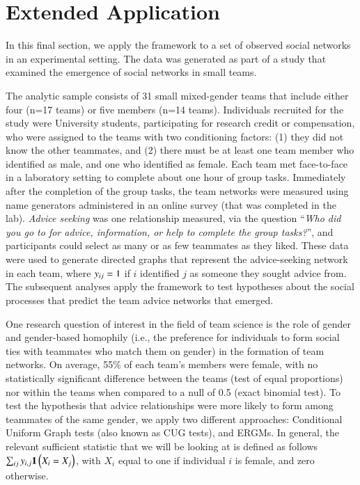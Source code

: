 \documentclass[review, nonatbib,doubleblind]{elsarticle/elsarticle}
\begin{document}
\section{Extended Application\label{sec:empirical}}

In this final section, we apply the \ergmitos{} framework to a set of observed social networks in an experimental setting. The data was generated as part of a study that examined the emergence of social networks in small teams. 

The analytic sample consists of 31 small mixed-gender teams that include either four (n=17 teams) or five members (n=14 teams). Individuals recruited for the study were University students, participating for research credit or compensation, who were assigned to the teams with two conditioning factors: (1) they did not know the other teammates, and (2) there must be at least one team member who identified as male, and one who identified as female. Each team met face-to-face in a laboratory setting to complete about one hour of group tasks. Immediately after the completion of the group tasks, the team networks were measured using name generators administered in an online survey (that was completed in the lab). \textit{Advice seeking} was one relationship measured, via the question ``\textit{Who did you go to for advice, information, or help to complete the group tasks?}'', and participants could select as many or as few teammates as they liked. These data were used to generate directed graphs that represent the advice-seeking network in each team, where $y_{ij} = 1$ if $i$ identified $j$ as someone they sought advice from. The subsequent analyses apply the \ergmitos{} framework to test hypotheses about the social processes that predict the team advice networks that emerged. 

One research question of interest in the field of team science is the role of gender and gender-based homophily (i.e., the preference for individuals to form social ties with teammates who match them on gender) in the formation of team networks. On average, 55\% of each team's members were female, with no statistically significant difference between the teams (test of equal proportions) nor within the teams when compared to a null of 0.5 (exact binomial test). To test the hypothesis that advice relationships were more likely to form among teammates of the same gender, we apply two different approaches: Conditional Uniform Graph tests (also known as CUG tests), and ERGMs. In general, the relevant sufficient statistic that we will be looking at is defined as follows $\sum_{ij}y_{i,j}{\boldsymbol{1}\left( X_i = X_j \right)}$, with $X_i$ equal to one if individual $i$ is female, and zero otherwise.
\end{document}
